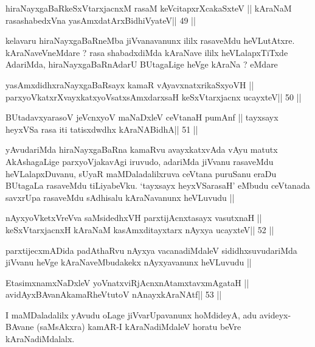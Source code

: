 \begin{shl}
hiraNayxgaBaRkeSxVtarxjacnxM rasaM keVcitapxrXcakaSxteV ||
kAraNaM rasashabedxVna yasAmxdatArxBidhiVyateV\hfill || 49 ||
\end{shl}

\begin{artha}
kelavaru hiraNayxgaBaRneMba jiVvanavanunx ililx rasaveMdu
heVLutAtxre. kAraNaveVneMdare ? rasa shabadxdiMda kAraNave ililx
heVLalapxTiTxde AdariMda, hiraNayxgaBaRnAdarU BUtagaLige heVge kAraNa
? eMdare
\end{artha}

\begin{shl}
yasAmxdidhxraNayxgaBaRsayx kamaR vAyavxnatxrikaSxyoVH ||
parxyoVkatxrXvayxkatxyoVsatxsAmxdarxsaH keSxVtarxjacnx ucayxteV\hfill || 50 ||
\end{shl}

\begin{shl}
BUtadavxyarasoV jeVcnxyoV maNaDxleV ceVtanaH pumAnf ||
tayxsayx heyxVSa rasa iti tatisxdwdhx kAraNABidhA\hfill || 51 ||
\end{shl}

\begin{artha}
yAvudariMda hiraNayxgaBaRna kamaRvu avayxkatxvAda vAyu matutx
AkAshagaLige parxyoVjakavAgi iruvudo, adariMda jiVvanu rasaveMdu
heVLalapxDuvanu, sUyaR maMDaladalilxruva ceVtana puruSanu eraDu
BUtagaLa rasaveMdu tiLiyabeVku. `tayxsayx heyxVSarasaH' eMbudu
ceVtanada savxrUpa rasaveMdu sAdhisalu kAraNavanunx heVLuvudu ||
\end{artha}

\begin{shl}
nAyxyoVketxVreVva saMsidedhxVH parxtijAcnxtasayx vasutxnaH ||
keSxVtarxjacnxH kAraNaM kasAmxditayxtarx nAyxya ucayxteV\hfill || 52 ||
\end{shl}

\begin{artha}
parxtijecxmADida padAthaRvu nAyxya vacanadiMdaleV sididhxsuvudariMda
jiVvanu heVge kAraNaveMbudakekx nAyxyavanunx heVLuvudu ||
\end{artha}

\begin{shl}
EtasimxnamxNaDxleV yoV\s natxviRjAcnxnAtamxtavxmAgataH ||
avidAyxBAvanAkamaRheVtutoV nAnayxkAraNAtf\hfill || 53 ||
\end{shl}

\begin{artha}
I maMDaladalilx yAvudu oLage jiVvarUpavanunx hoMdideyA, adu
avideyx-BAvane (saMsAkxra) kamAR-I kAraNadiMdaleV horatu beVre kAraNadiMdalalx.
\end{artha}

